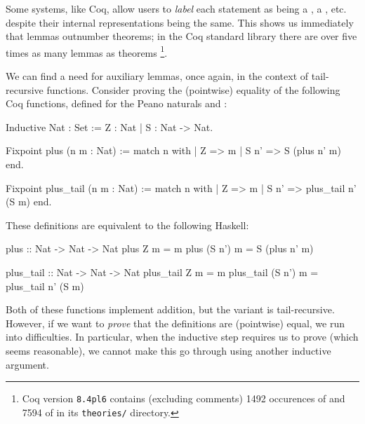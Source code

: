 Some systems, like Coq, allow users to \emph{label} each statement as being a
, a , etc. despite their internal representations being
the same. This shows us immediately that lemmas outnumber theorems; in the Coq
standard library there are over five times as many lemmas as theorems
\footnote{Coq version \texttt{8.4pl6} contains (excluding comments) 1492
  occurences of  and 7594 of  in its \texttt{theories/}
  directory.}.



We can find a need for auxiliary lemmas, once again, in the context of
tail-recursive functions. Consider proving the (pointwise) equality of the
following Coq functions, defined for the Peano naturals  and :

\begin{coqblock}
Inductive Nat : Set := Z : Nat
                     | S : Nat -> Nat.

Fixpoint plus      (n m : Nat) := match n with
                                      | Z    => m
                                      | S n' => S (plus n' m)
                                  end.

Fixpoint plus_tail (n m : Nat) := match n with
                                      | Z    => m
                                      | S n' => plus_tail n' (S m)
                                  end.
\end{coqblock}

These definitions are equivalent to the following Haskell:

\begin{haskell}
plus :: Nat -> Nat -> Nat
plus      Z      m = m
plus      (S n') m = S (plus n' m)

plus_tail :: Nat -> Nat -> Nat
plus_tail Z      m = m
plus_tail (S n') m = plus_tail n' (S m)
\end{haskell}

Both of these functions implement addition, but the  variant is
tail-recursive. However, if we want to \emph{prove} that the definitions are
(pointwise) equal, we run into difficulties. In particular, when the inductive
step requires us to prove  (which seems
reasonable), we cannot make this go through using another inductive argument.

